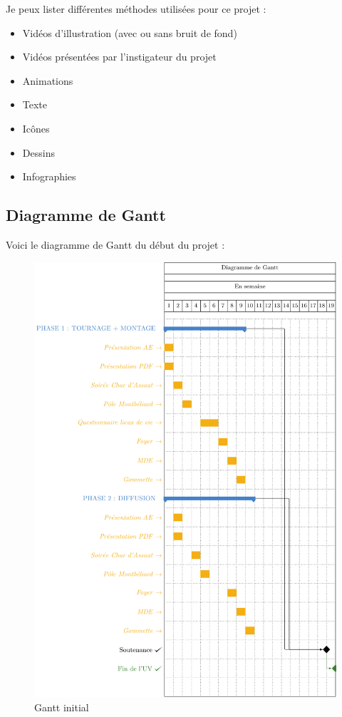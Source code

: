 Je peux lister différentes méthodes utilisées pour ce projet :
\begin{itemize}
    \item Vidéos d'illustration (avec ou sans bruit de fond)
    \item Vidéos présentées par l'instigateur du projet
    \item Animations
    \item Texte
    \item Icônes
    \item Dessins
    \item Infographies
\end{itemize}

\subsection{Diagramme de Gantt}\label{subsec:diagramme-de-gantt}

Voici le diagramme de Gantt du début du projet :

\begin{figure}[!h]
    \begin{center}
        \includegraphics[scale=0.6]{ressources/gantt}
        \caption{Gantt initial \label{fig:ganttIni}}
    \end{center}
\end{figure}

